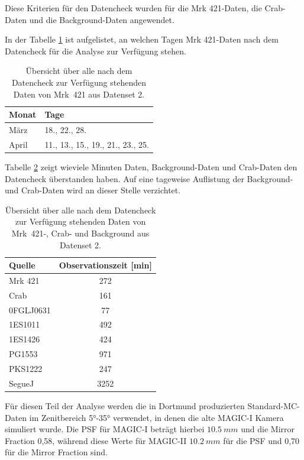 Diese Kriterien für den Datencheck wurden für die Mrk 421-Daten, die Crab-Daten und die Background-Daten angewendet.

In der Tabelle \ref{tab:Datenset2-Mrk421} ist aufgelistet, an welchen Tagen Mrk 421-Daten nach dem Datencheck für die Analyse zur Verfügung stehen.


\begin{table}[!h]
\centering
\caption{Übersicht über alle nach dem Datencheck zur Verfügung stehenden Daten von Mrk~421 aus Datenset 2.}
\label{tab:Datenset2-Mrk421}
\begin{tabular}{ll}
  \toprule
  Monat & Tage\\
  \midrule
  \midrule
März & 18., 22., 28.\\
April & 11., 13., 15., 19., 21., 23., 25. \\
  \bottomrule
\end{tabular}
\end{table}

Tabelle \ref{tab:Datenset2} zeigt wieviele Minuten Daten, Background-Daten und Crab-Daten den Datencheck überstanden haben. 
Auf eine tageweise Auflistung der Background- und Crab-Daten wird an dieser Stelle verzichtet.

\begin{table}[!h]
\centering
\caption{Übersicht über alle nach dem Datencheck zur Verfügung stehenden Daten von Mrk~421-, Crab- und Background aus Datenset 2.}
\label{tab:Datenset2}
\begin{tabular}{lc}
  \toprule
  Quelle & Observationszeit [min]\\
  \midrule
  \midrule
  Mrk 421 & 272\\
  \midrule
  Crab & 161\\
  \midrule
  0FGLJ0631 & 77 \\
  1ES1011 & 492 \\
  1ES1426 & 424 \\
  PG1553 & 971 \\
  PKS1222 & 247 \\
  SegueJ & 3252 \\
  \bottomrule
\end{tabular}
\end{table}

Für diesen Teil der Analyse werden die in Dortmund produzierten Standard-MC-Daten im Zenitbereich 5°-35° verwendet, in denen die alte MAGIC-I Kamera simuliert wurde.
Die PSF für MAGIC-I beträgt hierbei $\SI{10,5}{mm}$ und die Mirror Fraction 0,58, während diese Werte für MAGIC-II $\SI{10,2}{mm}$ für die PSF und 0,70 für die Mirror Fraction sind.

